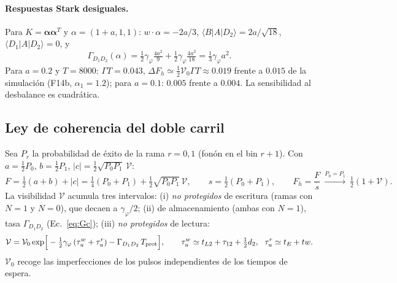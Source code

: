\documentclass[11pt,a4paper]{article}
\newcommand{\gphi}{\gamma_\varphi}
\begin{document}
\paragraph{Respuestas Stark desiguales.}
Para $K=\bm\alpha\bm\alpha^T$ y $\alpha=(1+a,1,1)$: $w\!\cdot\!\alpha=-2a/3$, $\langle B|A|D_2\rangle=2a/\sqrt{18}$,
$\langle D_1|A|D_2\rangle=0$, y
\begin{equation}
\Gamma_{D_1D_2}(\alpha)=\tfrac12\gphi\tfrac{4a^2}{9}+\tfrac12\gphi\tfrac{4a^2}{18}=\tfrac13\gphi a^2 .
\end{equation}
Para $a=0.2$ y $T=8000$: $\Gamma T=0.043$, $\Delta F_h\simeq\tfrac12\mathcal V_0\Gamma T\approx0.019$ frente a $0.015$ de la simulación (F14b, $\alpha_1=1.2$);
para $a=0.1$: $0.005$ frente a $0.004$. La sensibilidad al desbalance es cuadrática.

\subsection{Ley de coherencia del doble carril}
Sea $P_r$ la probabilidad de éxito de la rama $r=0,1$ (fonón en el bin $r{+}1$). Con
$a=\tfrac12P_0$, $b=\tfrac12P_1$, $|c|=\tfrac12\sqrt{P_0P_1}\,\mathcal V$:
\begin{equation}
F=\tfrac12(a+b)+|c|=\tfrac14(P_0+P_1)+\tfrac12\sqrt{P_0P_1}\,\mathcal V,\qquad
s=\tfrac12(P_0+P_1),\qquad F_h=\frac Fs\ \xrightarrow{P_0=P_1}\ \tfrac12(1+\mathcal V).\label{eq:F}
\end{equation}
La visibilidad $\mathcal V$ acumula tres intervalos: (i) \emph{no protegidos} de escritura (ramas con $N=1$ y $N=0$), que decaen a $\gphi/2$;
(ii) de almacenamiento (ambas con $N=1$), tasa $\Gamma_{D_1D_2}$ (Ec.~\ref{eq:Gc}); (iii) \emph{no protegidos} de lectura:
\begin{equation}
\mathcal V=\mathcal V_0\exp\!\Big[-\tfrac12\gphi\,(\tau_{u}^{w}+\tau_{u}^{r})-\Gamma_{D_1D_2}\,T_{\rm prot}\Big],\qquad
\tau_u^{w}\simeq t_{L2}+\tau_{12}+\tfrac12 d_2,\ \ \tau_u^{r}\simeq t_E+tw .\label{eq:V}
\end{equation}
$\mathcal V_0$ recoge las imperfecciones de los pulsos independientes de los tiempos de espera.
\end{document}
